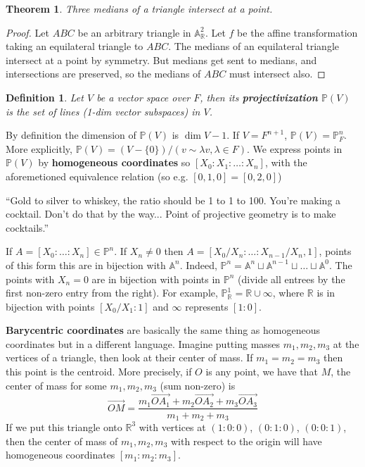 \documentclass[12pt]{article}
\newcommand{\R}{\mathbb{R}}
\renewcommand{\P}{\mathbb{P}}
\newcommand{\A}{\mathbb{A}}
\renewcommand{\vec}{\overrightarrow}
\newtheorem{definition}{Definition}
\newtheorem{theorem}{Theorem}
\begin{document}
    \begin{theorem}
        Three medians of a triangle intersect at a point. 
    \end{theorem} 
    \begin{proof}
        Let $ABC$ be an arbitrary triangle in $\A_\R^2$. Let $f$ be the affine transformation taking an equilateral triangle to $ABC$. The medians of an equilateral triangle intersect at a point by symmetry. But medians get sent to medians, and intersections are preserved, so the medians of $ABC$ must intersect also. 
    \end{proof}
    \begin{definition}
        Let $V$ be a vector space over $F$, then its \textbf{projectivization} $\P(V)$ is the set of lines (1-dim vector subspaces) in $V$. 
    \end{definition}
    By definition the dimension of $\P(V)$ is $\dim V - 1$. If $V = F^{n+1}$, $\P(V) = \P_F^n$. More explicitly, $\P(V) = (V - \{0\})/(v \sim \lambda v, \lambda \in F)$. 
    We express points in $\P(V)$ by \textbf{homogeneous coordinates} so $[X_0: X_1 : \dots : X_n]$, with the aforemetioned equivalence relation (so e.g. $[0, 1, 0] = [0, 2, 0]$) \par 
    ``Gold to silver to whiskey, the ratio should be 1 to 1 to 100. You're making a cocktail. Don't do that by the way... Point of projective geometry is to make cocktails.''\par 
    If $A = [X_0: \dots :X_n] \in \P^n$. If $X_n \neq 0$ then $A = [X_0/X_n: \dots : X_{n-1}/X_n, 1]$, points of this form this are in bijection with $\A^n$. Indeed, $\P^n = \A^n \sqcup \A^{n-1} \sqcup \dots \sqcup \A^0$. The points with $X_n = 0$ are in bijection with points in $\P^n$ (divide all entrees by the first non-zero entry from the right). For example, $\P_\R^1 = \R \cup \infty$, where $\R$ is in bijection with points $[X_0/X_1:1]$ and $\infty$ represents $[1:0]$.  \par 
    \textbf{Barycentric coordinates} are basically the same thing as homogeneous coordinates but in a different language. Imagine putting masses $m_1, m_2, m_3$ at the vertices of a triangle, then look at their center of mass. If $m_1 = m_2 = m_3$ then this point is the centroid. More precisely, if $O$ is any point, we have that $M$, the center of mass for some $m_1, m_2, m_3$ (sum non-zero) is
    $$\vec{OM} = \frac{m_1\vec{OA_1} + m_2\vec{OA_2} + m_3\vec{OA_3}}{m_1 + m_2 + m_3}$$
    If we put this triangle onto $\R^3$ with vertices at $(1:0:0)$, $(0:1:0)$, $(0:0:1)$, then the center of mass of $m_1, m_2, m_3$ with respect to the origin will have homogeneous coordinates $[m_1:m_2:m_3]$. \par 
\end{document}

